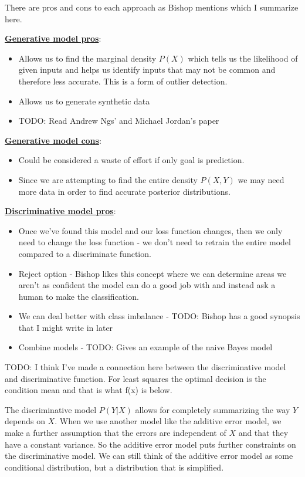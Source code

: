 There are pros and cons to each approach as Bishop mentions which I summarize here.
\break

\noindent \underline{\textbf{Generative model pros}}:
\begin{itemize}
\item Allows us to find the marginal density $P(X)$ which tells us the likelihood of given inputs and helps us identify inputs that may not be common and therefore less accurate. This is a form of outlier detection.
\item Allows us to generate synthetic data
\item TODO: Read Andrew Ngs' and Michael Jordan's paper
\end{itemize}

\noindent \underline{\textbf{Generative model cons}}:
\begin{itemize}
\item Could be considered a waste of effort if only goal is prediction. 
\item Since we are attempting to find the entire density $P(X,Y)$ we may need more data in order to find accurate posterior distributions.
\end{itemize}

\noindent \underline{\textbf{Discriminative model pros}}:
\begin{itemize}
\item Once we've found this model and our loss function changes, then we only need to change the loss function - we don't need to retrain the entire model compared to a discriminate function.
\item Reject option - Bishop likes this concept where we can determine areas we aren't as confident the model can do a good job with and instead ask a human to make the classification.
\item We can deal better with class imbalance - TODO: Bishop has a good synopsis that I might write in later
\item Combine models - TODO: Gives an example of the naive Bayes model
\end{itemize}

TODO: I think I've made a connection here between the discriminative model and discriminative function. For least squares the optimal decision is the condition mean and that is what f(x) is below.

The discriminative model $P(Y|X)$ allows for completely summarizing the way $Y$ depends on $X$. When we use another model like the additive error model, we make a further assumption that the errors are independent of $X$ and that they have a constant variance. So the additive error model puts further constraints on the discriminative model. We can still think of the additive error model as some conditional distribution, but a distribution that is simplified.

